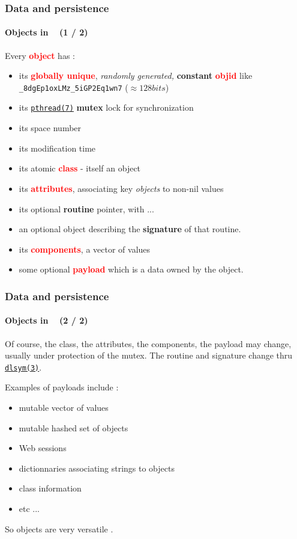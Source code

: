 \documentclass[xcolor=svgnames,final,smaller,a4]{beamer}
\begin{document}
\begin{frame}
    \frametitle{Data and persistence}
    \framesubtitle{Objects in \Bismon ~ (1 / 2)}

    Every \textcolor{red}{\textbf{object}} has : 
    \begin{itemize}
    \item its \textcolor{red}{\textbf{globally unique}}, \textit{randomly generated,}  \textbf{constant} \textcolor{red}{\textbf{objid}} like \texttt{\_8dgEp1oxLMz\_5iGP2Eq1wn7} ($\approx 128 bits$)
    \item its {\href{http://man7.org/linux/man-pages/man7/pthreads.7.html}{\texttt{pthread(7)}}} \textbf{mutex} lock for synchronization
    \item its space number
    \item its modification time
    \item its atomic {\textcolor{red}{\textbf{class}}} - itself an object
    \item its {\textcolor{red}{\textbf{attributes}}}, associating key \textit{objects} to non-nil values
    \item its optional \textbf{routine} pointer, with ...
    \item an optional object describing the \textbf{signature} of that routine.
  \item its {\textcolor{red}{\textbf{components}}}, a vector of values
  \item some optional {\textcolor{red}{\textbf{payload}}} which is a data owned by the object. 
    \end{itemize}

\end{frame}


\begin{frame}
    \frametitle{Data and persistence}
    \framesubtitle{Objects in \Bismon ~ (2 / 2)}
    
Of course, the class, the attributes, the components, the payload may
change, usually under protection of the mutex.  The routine and
signature change thru
{\href{http://man7.org/linux/man-pages/man3/dlsym.3.html}{\texttt{dlsym(3)}}}.

Examples of payloads include :
\begin{itemize}
\item mutable vector of values
\item mutable hashed set of objects
\item Web sessions
\item dictionnaries associating strings to objects
\item class information {}
\item etc ...
\end{itemize}

So objects are very versatile {}.
\end{frame}
\end{document}
